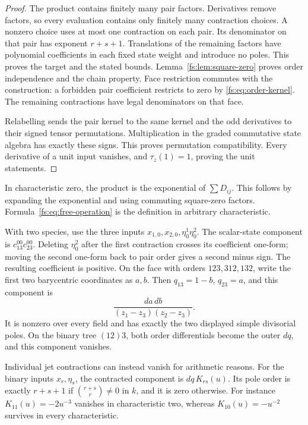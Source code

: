 \begin{proof}
The product contains finitely many pair factors.  Derivatives remove
factors, so every evaluation contains only finitely many contraction
choices.  A nonzero choice uses at most one contraction on each
pair.  Its denominator on that pair has exponent \(r+s+1\).
Translations of the remaining factors have polynomial coefficients
in each fixed state weight and introduce no poles.  This proves
the target and the stated bounds.
Lemma~\ref{fs:lem:square-zero} proves order independence and the chain
property.  Face restriction commutes with the construction: a forbidden
pair coefficient restricts to zero by \eqref{fs:eq:order-kernel}.
The remaining contractions have legal denominators on that face.

Relabelling sends the pair kernel to the same kernel and the odd
derivatives to their signed tensor permutations.  Multiplication in
the graded commutative state algebra has exactly these signs.
This proves permutation compatibility.  Every derivative of a unit
input vanishes, and \(\tau_z(1)=1\), proving the unit statements.
\end{proof}

In characteristic zero, the product is the exponential of
\(\sum D_{ij}\).  This follows by expanding the exponential and
using commuting square-zero factors.  Formula~\eqref{fs:eq:free-operation}
is the definition in arbitrary characteristic.

\begin{example}
With two species, use the three inputs
\(x_{1,0},x_{2,0},\eta^1_0\eta^2_0\).
The scalar-state component is \(c_{13}^{00}c_{23}^{00}\).
Deleting \(\eta^2_0\) after the first contraction crosses its
coefficient one-form; moving the second one-form back to pair order
gives a second minus sign.  The resulting coefficient is positive.
On the face with orders \(123,312,132\), write the first two
barycentric coordinates as \(a,b\).  Then
\(q_{13}=1-b\), \(q_{23}=a\), and this component is
\[
 \frac{da\,db}{(z_1-z_3)(z_2-z_3)}.
\]
It is nonzero over every field and has exactly the two displayed
simple divisorial poles.  On the binary tree \((12)3\), both order
differentials become the outer \(dq\), and this component vanishes.

Individual jet contractions can instead vanish for arithmetic reasons.
For the binary inputs \(x_r,\eta_s\), the contracted component is
\(dq\,K_{rs}(u)\).  Its pole order is exactly \(r+s+1\)
if \(\binom{r+s}{r}\ne0\) in \(k\), and it is zero otherwise.
For instance \(K_{11}(u)=-2u^{-3}\) vanishes in characteristic two,
whereas \(K_{10}(u)=-u^{-2}\) survives in every characteristic.
\end{example}

